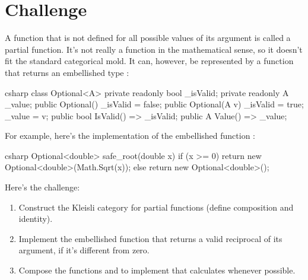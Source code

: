 \section{Challenge}

A function that is not defined for all possible values of its argument
is called a partial function. It's not really a function in the
mathematical sense, so it doesn't fit the standard categorical mold. It
can, however, be represented by a function that returns an embellished
type :

\begin{snip}{csharp}
class Optional<A> {
    private readonly bool _isValid;
    private readonly A _value;
    public Optional() { _isValid = false; }
    public Optional(A v) { _isValid = true; _value = v; }
    public bool IsValid() => _isValid;
    public A Value() => _value;
}
\end{snip}
For example, here's the implementation of the embellished function
:

\begin{snip}{csharp}
Optional<double> safe_root(double x) {
    if (x >= 0) return new Optional<double>(Math.Sqrt(x));
    else return new Optional<double>();
}
\end{snip}
Here's the challenge:

\begin{enumerate}
  \tightlist
  \item
        Construct the Kleisli category for partial functions (define
        composition and identity).
  \item
        Implement the embellished function  that
        returns a valid reciprocal of its argument, if it's different from
        zero.
  \item
        Compose the functions  and  to implement
         that calculates 
        whenever possible.
\end{enumerate}
